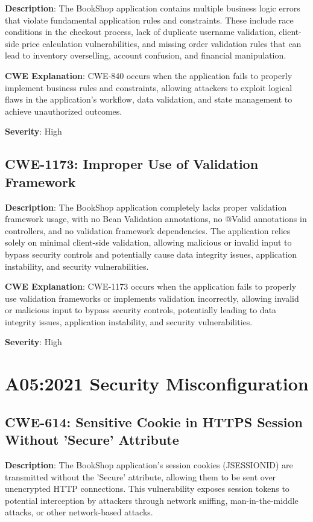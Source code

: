 \documentclass[]{UCD_CS_FYP_Report}
\begin{document}
\textbf{Description}: The BookShop application contains multiple business logic errors that violate fundamental application rules and constraints. These include race conditions in the checkout process, lack of duplicate username validation, client-side price calculation vulnerabilities, and missing order validation rules that can lead to inventory overselling, account confusion, and financial manipulation.

\textbf{CWE Explanation}: CWE-840 occurs when the application fails to properly implement business rules and constraints, allowing attackers to exploit logical flaws in the application's workflow, data validation, and state management to achieve unauthorized outcomes.

\textbf{Severity}: High



\section{CWE-1173: Improper Use of Validation Framework}

\textbf{Description}: The BookShop application completely lacks proper validation framework usage, with no Bean Validation annotations, no @Valid annotations in controllers, and no validation framework dependencies. The application relies solely on minimal client-side validation, allowing malicious or invalid input to bypass security controls and potentially cause data integrity issues, application instability, and security vulnerabilities.

\textbf{CWE Explanation}: CWE-1173 occurs when the application fails to properly use validation frameworks or implements validation incorrectly, allowing invalid or malicious input to bypass security controls, potentially leading to data integrity issues, application instability, and security vulnerabilities.

\textbf{Severity}: High




\chapter{A05:2021 Security Misconfiguration}

\section{CWE-614: Sensitive Cookie in HTTPS Session Without 'Secure' Attribute}

\textbf{Description}: The BookShop application's session cookies (JSESSIONID) are transmitted without the 'Secure' attribute, allowing them to be sent over unencrypted HTTP connections. This vulnerability exposes session tokens to potential interception by attackers through network sniffing, man-in-the-middle attacks, or other network-based attacks.
\end{document}
